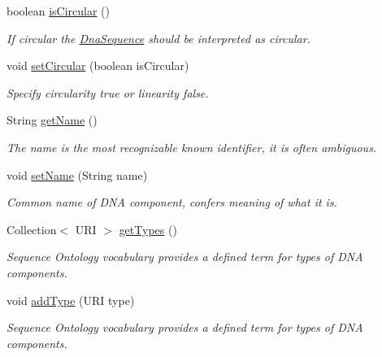 \begin{DoxyCompactItemize}
boolean \hyperlink{classorg_1_1sbolstandard_1_1lib_s_b_o_lj_1_1_dna_component_a38c303dc9a19b2789b973aea68824e1e}{isCircular} ()
\begin{DoxyCompactList}\small\item\em If circular the \hyperlink{classorg_1_1sbolstandard_1_1lib_s_b_o_lj_1_1_dna_sequence}{DnaSequence} should be interpreted as circular. \item\end{DoxyCompactList}\item 
void \hyperlink{classorg_1_1sbolstandard_1_1lib_s_b_o_lj_1_1_dna_component_aa985eba9ff6208a84c0da097ade01781}{setCircular} (boolean isCircular)
\begin{DoxyCompactList}\small\item\em Specify circularity {\ttfamily true} or linearity {\ttfamily false}. \item\end{DoxyCompactList}\item 
String \hyperlink{classorg_1_1sbolstandard_1_1lib_s_b_o_lj_1_1_dna_component_a78ee178b6a73658d65ca60da4d1e6683}{getName} ()
\begin{DoxyCompactList}\small\item\em The name is the most recognizable known identifier, it is often ambiguous. \item\end{DoxyCompactList}\item 
void \hyperlink{classorg_1_1sbolstandard_1_1lib_s_b_o_lj_1_1_dna_component_ad737b36b74be994e0d8420797ed72f78}{setName} (String name)
\begin{DoxyCompactList}\small\item\em Common name of DNA component, confers meaning of what it is. \item\end{DoxyCompactList}\item 
Collection$<$ URI $>$ \hyperlink{classorg_1_1sbolstandard_1_1lib_s_b_o_lj_1_1_dna_component_a518b97368db3de477d5fb57150d8b711}{getTypes} ()
\begin{DoxyCompactList}\small\item\em Sequence Ontology vocabulary provides a defined term for types of DNA components. \item\end{DoxyCompactList}\item 
void \hyperlink{classorg_1_1sbolstandard_1_1lib_s_b_o_lj_1_1_dna_component_a26d3aea2567e9235daef5a79a5e6a521}{addType} (URI type)
\begin{DoxyCompactList}\small\item\em Sequence Ontology vocabulary provides a defined term for types of DNA components. \item\end{DoxyCompactList}\item 

\end{DoxyCompactItemize}
